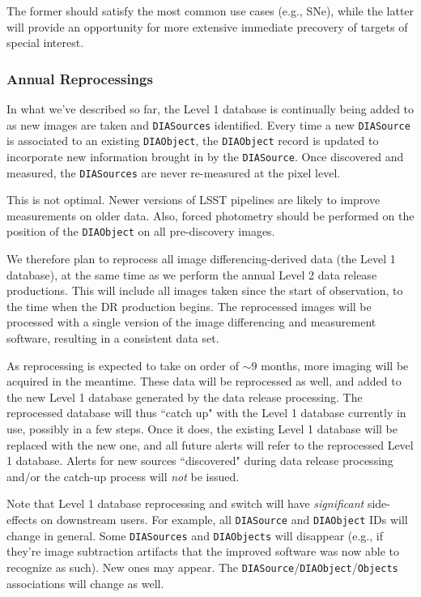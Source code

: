 \documentclass[12pt]{article}
\newcommand{\code}[1]{\texttt{#1}}
\newcommand{\DIASource}{\code{DIASource}\xspace}
\newcommand{\DIASources}{\code{DIASources}\xspace}
\newcommand{\DIAObject}{\code{DIAObject}\xspace}
\newcommand{\DIAObjects}{\code{DIAObjects}\xspace}
\newcommand{\DB}{{Level 1 database}\xspace}
\newcommand{\Objects}{\code{Objects}\xspace}
\begin{document}
The former should satisfy the most common use cases (e.g., SNe), while the latter will provide an opportunity for more extensive immediate precovery of targets of special interest.

\subsubsection{Annual Reprocessings}
\label{sec:l1dbreproc}

In what we've described so far, the \DB is continually being added to as new images are taken and \DIASources identified. Every time a new \DIASource is associated to an existing \DIAObject, the \DIAObject record is updated to incorporate new information brought in by the \DIASource. Once discovered and measured, the \DIASources are never re-measured at the pixel level.

This is not optimal. Newer versions of LSST pipelines are likely to improve measurements on older data. Also, forced photometry should be performed on the position of the \DIAObject on all pre-discovery images.

We therefore plan to reprocess all image differencing-derived data (the \DB), at the same time as we perform the annual Level 2 data release productions. This will include all images taken since the start of observation, to the time when the DR production begins. The reprocessed images will be processed with a single version of the image differencing and measurement software, resulting in a consistent data set.

As reprocessing is expected to take on order of $\sim 9$ months, more imaging will be acquired in the meantime. These data will be reprocessed as well, and added to the new \DB generated by the data release processing. The reprocessed database will thus ``catch up" with the \DB currently in use, possibly in a few steps. Once it does, the existing \DB will be replaced with the new one, and all future alerts will refer to the reprocessed \DB. Alerts for new sources ``discovered" during data release processing and/or the catch-up process will {\em not} be issued.

\vspace{1em}
Note that \DB reprocessing and switch will have {\em significant} side-effects on downstream users. For example, all \DIASource and \DIAObject IDs will change in general. Some \DIASources and \DIAObjects will disappear (e.g., if they're image subtraction artifacts that the improved software was now able to recognize as such). New ones may appear. The \DIASource/\DIAObject/\Objects associations will change as well.
\end{document}
